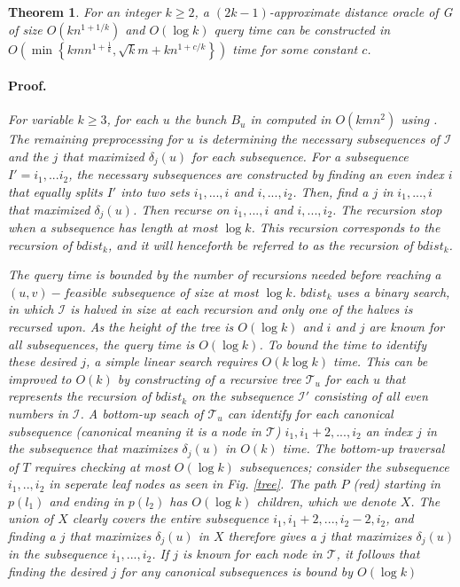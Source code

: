 \documentclass[12pt]{article}
\newtheorem{thm}{Theorem}[section]
\begin{document}
\begin{thm}
For an integer $k\geq 2$, a $(2k - 1)$-approximate distance oracle of G of size $O(kn^{1+1/k})$ and $O(\log k)$ query time can be constructed in $O\left( \min \left\lbrace kmn^{1+\frac{1}{k}}, \sqrt{k}m + kn^{1+c/k}\right\rbrace\right)$ time for some constant $c$.

\paragraph{Proof.} 

For variable $k\geq 3$, for each $u$ the bunch $B_u$ in computed in $O(kmn^{2})$ using \cite{Thorup2005}. The remaining preprocessing for $u$ is determining the necessary subsequences of $\mathcal{I}$ and the $j$ that maximized $\delta_j(u)$ for each subsequence.
For a subsequence $I'=i_1,...i_2$, the necessary subsequences are constructed by finding an even index $i$ that equally splits $I'$ into two sets $i_1,...,i$ and $i,...,i_2$. Then, find a $j$ in $i_1,...,i$ that maximized $\delta_j(u)$. Then recurse on $i_1,...,i$ and $i,...,i_2$. The recursion stop when a subsequence has length at most $\log k$. This recursion corresponds to the recursion of $bdist_k$, and it will henceforth be referred to as the recursion of $bdist_k$.

The query time is bounded by the number of recursions needed before reaching a $(u,v)-feasible$ subsequence of size at most $\log k$. $bdist_k$ uses a binary search, in which $\mathcal{I}$ is halved in size at each recursion and only one of the halves is recursed upon. As the height of the tree is $O(\log k)$ and $i$ and $j$ are known for all subsequences, the query time is $O(\log k)$.
To bound the time to identify these desired $j$, a simple linear search requires $O(k\log k)$ time. This can be improved to $O(k)$ by constructing of a recursive tree $\mathcal{T}_u$ for each $u$ that represents the recursion of $bdist_k$ on the subsequence $\mathcal{I}'$ consisting of all even numbers in $\mathcal{I}$. A bottom-up seach of $\mathcal{T}_u$ can identify for each canonical subsequence (canonical meaning it is a node in $\mathcal{T}$) $i_1,i_1+2,...,i_2$ an index $j$ in the subsequence that maximizes $\delta_j(u)$ in $O(k)$ time. The bottom-up traversal of $T$ requires checking at most $O(\log k)$ subsequences; consider the subsequence $i_1,..,i_2$ in seperate leaf nodes as seen in Fig. \ref{tree}. The path $P$ (red) starting in $p(l_1)$ and ending in $p(l_2)$ has $O(\log k)$ children, which we denote $X$. The union of $X$ clearly covers the entire subsequence $i_1,i_1+2,...,i_2-2,i_2$, and finding a $j$ that maximizes $\delta_j(u)$ in $X$ therefore gives a $j$ that maximizes $\delta_j(u)$ in the subsequence $i_1,...,i_2$. If $j$ is known for each node in $\mathcal{T}$, it follows that finding the desired $j$ for any canonical subsequences is bound by $O(\log k)$\\


\end{thm}
\end{document}
